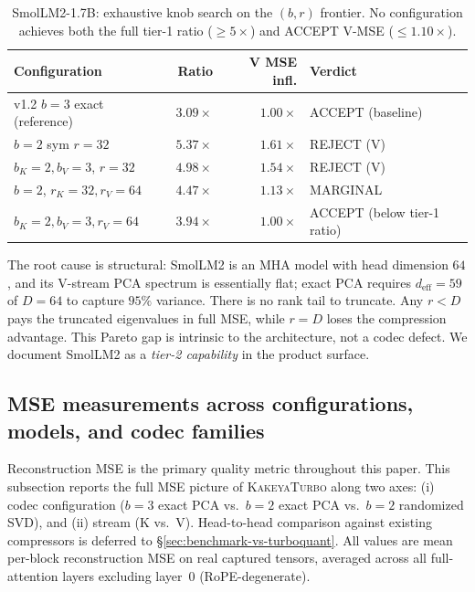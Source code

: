 \documentclass[11pt,a4paper]{article}
\theoremstyle{definition}
\theoremstyle{plain}
\begin{document}
\begin{table}[H]
\centering
\small
\caption{SmolLM2-1.7B: exhaustive knob search on the $(b, r)$ frontier. No configuration achieves both the full tier-1 ratio ($\ge 5\times$) and ACCEPT V-MSE ($\le 1.10\times$).}
\label{tab:smollm2}
\begin{tabular}{lrrl}
  \toprule
  Configuration & Ratio & V MSE infl. & Verdict \\
  \midrule
  v1.2 $b=3$ exact (reference)  & $3.09\times$ & $1.00\times$ & ACCEPT (baseline) \\
  $b=2$ sym $r=32$              & $5.37\times$ & $1.61\times$ & REJECT (V) \\
  $b_K{=}2, b_V{=}3$, $r{=}32$  & $4.98\times$ & $1.54\times$ & REJECT (V) \\
  $b=2$, $r_K{=}32, r_V{=}64$   & $4.47\times$ & $1.13\times$ & MARGINAL \\
  $b_K{=}2,b_V{=}3, r_V{=}64$   & $3.94\times$ & $1.00\times$ & ACCEPT (below tier-1 ratio) \\
  \bottomrule
\end{tabular}
\end{table}

The root cause is structural: SmolLM2 is an MHA model with head dimension $64$, and its V-stream PCA spectrum is essentially flat; exact PCA requires $d_{\text{eff}} = 59$ of $D = 64$ to capture $95\%$ variance. There is no rank tail to truncate. Any $r < D$ pays the truncated eigenvalues in full MSE, while $r = D$ loses the compression advantage. This Pareto gap is intrinsic to the architecture, not a codec defect. We document SmolLM2 as a \emph{tier-2 capability} in the product surface.

\subsection{MSE measurements across configurations, models, and codec families}
\label{sec:mse-detail}

Reconstruction MSE is the primary quality metric throughout this paper. This subsection reports the full MSE picture of \textsc{KakeyaTurbo} along two axes: (i) codec configuration ($b=3$ exact PCA vs.\ $b=2$ exact PCA vs.\ $b=2$ randomized SVD), and (ii) stream (K vs.\ V). Head-to-head comparison against existing compressors is deferred to \S\ref{sec:benchmark-vs-turboquant}. All values are mean per-block reconstruction MSE on real captured tensors, averaged across all full-attention layers excluding layer~0 (RoPE-degenerate).
\end{document}
